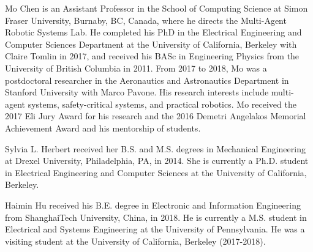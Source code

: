 \documentclass[journal]{IEEEtran}
\begin{document}

\begin{IEEEbiography}{Mo Chen}
	is an Assistant Professor in the School of Computing Science at Simon Fraser University, Burnaby, BC, Canada, where he directs the Multi-Agent Robotic Systems Lab. He completed his PhD in the Electrical Engineering and Computer Sciences Department at the University of California, Berkeley with Claire Tomlin in 2017, and received his BASc in Engineering Physics from the University of British Columbia in 2011. From 2017 to 2018, Mo was a postdoctoral researcher in the Aeronautics and Astronautics Department in Stanford University with Marco Pavone. His research interests include multi-agent systems, safety-critical systems, and practical robotics. Mo received the 2017 Eli Jury Award for his research and the 2016 Demetri Angelakos Memorial Achievement Award and his mentorship of students.\vspace{-1cm}
\end{IEEEbiography}
\begin{IEEEbiography}{Sylvia L. Herbert}
	received her B.S. and M.S. degrees in Mechanical Engineering at Drexel University, Philadelphia, PA, in 2014. She is currently a Ph.D. student in Electrical Engineering and Computer Sciences at the University of California, Berkeley.\vspace{-1cm}
\end{IEEEbiography}
\begin{IEEEbiography}{Haimin Hu}
	received his B.E. degree in Electronic and Information Engineering from ShanghaiTech University, China, in 2018. He is currently a M.S. student in Electrical and Systems Engineering at the University of Pennsylvania. He was a visiting student at the University of California, Berkeley (2017-2018).\vspace{-1cm}
\end{IEEEbiography}
\end{document}
